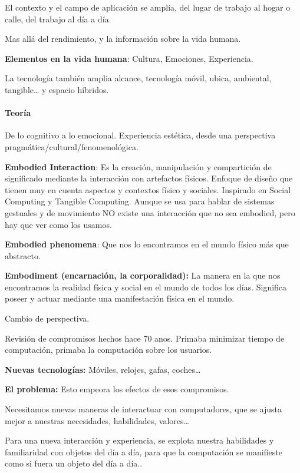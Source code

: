 El contexto y el campo de aplicación se amplía, del lugar de trabajo al
hogar o calle, del trabajo al día a día.

Mas allá del rendimiento, y la información sobre la vida humana.

\textbf{Elementos en la vida humana}: Cultura, Emociones, Experiencia.

La tecnología también amplia alcance, tecnología móvil, ubica,
ambiental, tangible\ldots{} y espacio híbridos.

\hypertarget{teoruxeda-2}{%
\paragraph{Teoría}\label{teoruxeda-2}}

De lo cognitivo a lo emocional. Experiencia estética, desde una
perspectiva pragmática/cultural/fenomenológica.

\textbf{Embodied Interaction}: Es la creación, manipulación y
compartición de significado mediante la interacción con artefactos
físicos. Enfoque de diseño que tienen muy en cuenta aspectos y contextos
físico y sociales. Inspirado en Social Computing y Tangible Computing.
Aunque se usa para hablar de sistemas gestuales y de movimiento NO
existe una interacción que no sea embodied, pero hay que ver como los
usamos.

\textbf{Embodied phenomena}: Que nos lo encontramos en el mundo físico
más que abstracto.

\textbf{Embodiment (encarnación, la corporalidad):} La manera en la que
nos encontramos la realidad física y social en el mundo de todos los
días. Significa poseer y actuar mediante una manifestación física en el
mundo.

Cambio de perspectiva.

Revisión de compromisos hechos hace 70 anos. Primaba minimizar tiempo de
computación, primaba la computación sobre los usuarios.

\textbf{Nuevas tecnologías:} Móviles, relojes, gafas, coches\ldots{}

\textbf{El problema:} Esto empeora los efectos de esos compromisos.

Necesitamos nuevas maneras de interactuar con computadores, que se
ajusta mejor a nuestras necesidades, habilidades, valores\ldots{}

Para una nueva interacción y experiencia, se explota nuestra habilidades
y familiaridad con objetos del día a día, para que la computación se
manifieste como si fuera un objeto del día a día..

